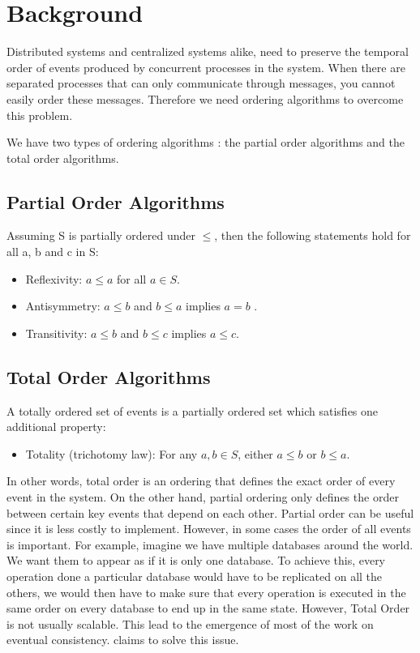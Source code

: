 \section{Background}
\label{sec:background}
Distributed systems and centralized systems alike, need to preserve the temporal order of events produced by concurrent processes in the system. When there are separated processes that can only communicate through messages, you cannot easily order these messages.
Therefore we need ordering algorithms to overcome this problem.
\par
We have two types of ordering algorithms \autocite{lamport1978time}: the partial order algorithms and the total order algorithms.
\subsection{Partial Order Algorithms}
Assuming S is partially ordered under $\leq$, then the following statements hold for all a, b and c in S:
\begin{itemize}
	\item Reflexivity: $a \leq a$ for all $a \in S$.
	\item Antisymmetry: $a \leq b$ and $b \leq a$ implies $a=b$ .
	\item Transitivity: $a \leq b$  and $b \leq c$  implies $a \leq c$.
\end{itemize}

\subsection{Total Order Algorithms}
A totally ordered set of events is a partially ordered set which satisfies one additional property:
\begin{itemize}
	\item Totality (trichotomy law): For any $a, b \in S$, either $a \leq b$  or $b \leq a$.
\end{itemize}
\par
In other words, total order is an ordering that defines the exact order of every event in the system. On the other hand, partial ordering only defines the order between certain key events that depend on each other. Partial order can be useful since it is less costly to implement. However, in some cases the order of all events is important. For example, imagine we have multiple databases around the world. We want them to appear as if it is only one database. To achieve this, every operation done a particular database would have to be replicated on all the others, we would then have to make sure that every operation is executed in the same order on every database to end up in the same state. However, Total Order is not usually scalable. This lead to the emergence of most of the work on eventual consistency. \epto claims to solve this issue.

